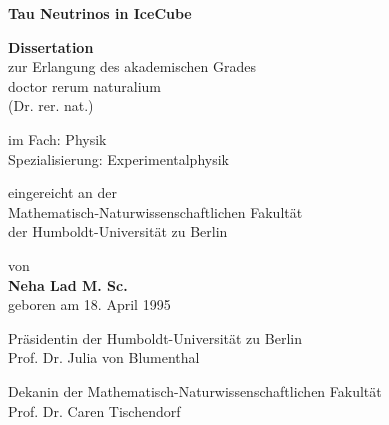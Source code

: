 \thispagestyle{plain}
\begin{center}
	\vspace*{1cm}

	\LARGE
	\textbf{Tau Neutrinos in IceCube}
	\large

	\vspace{0.8cm}

	\textbf{Dissertation}\\
	zur Erlangung des akademischen Grades\\
	doctor rerum naturalium \\
	(Dr. rer. nat.) \\

	\vspace{0.5cm}

	im Fach: Physik \\
	Spezialisierung: Experimentalphysik\\

	\vspace{0.5cm}

	eingereicht an der \\
	Mathematisch-Naturwissenschaftlichen Fakultät\\
	der Humboldt-Universität zu Berlin\\

	\vspace{0.5cm}

	von\\
	\textbf{Neha Lad M. Sc.}\\
	geboren am 18. April 1995\\
	

	\vspace{0.5cm}

	Präsidentin der Humboldt-Universität zu Berlin \\
	Prof. Dr. Julia von Blumenthal \\

	\vspace{0.5cm}

	Dekanin der Mathematisch-Naturwissenschaftlichen Fakultät \\
	Prof. Dr. Caren Tischendorf \\

	\vspace{0.5cm}




\end{center}


